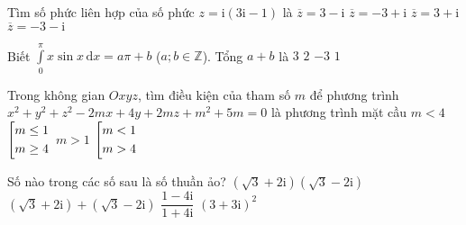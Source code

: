 \begin{ex}%
	Tìm số phức liên hợp của số phức $z = \mathrm{i}\left(3\mathrm{i} - 1\right)$ là
	\choice
	{$\overline{z} = 3 - \mathrm{i}$}
	{\True $\overline{z} = - 3 + \mathrm{i}$}
	{$\overline{z} = 3 + \mathrm{i}$}
	{$\overline{z} = - 3 - \mathrm{i}$}
\end{ex}


\begin{ex}%
	Biết  $\displaystyle\int\limits_{0}^{\pi}x\sin x\, \mathrm{d}x = a\pi + b$ ($a; b \in \mathbb{Z}$). Tổng $a + b$ là
	\choice
	{$3$}
	{$2$}
	{$- 3$}
	{\True $1$}
\end{ex}

\begin{ex}%
Trong không gian $Oxyz$, tìm điều kiện của tham số $m$ để phương trình $x^2 + y^2 + z^2  - 2mx + 4y + 2mz + m^2 + 5m = 0$ là phương trình mặt cầu
	\choice
	{$m < 4$}
	{$\left[\begin{aligned}&m\leq 1\\&m\geq 4\end{aligned}\right.$}
	{$m > 1$}
	{\True $\left[\begin{aligned}&m < 1\\& m> 4\end{aligned}\right.$}
\end{ex}

\begin{ex}%
Số nào trong các số sau là số thuần ảo?
	\choice
	{$\left(\sqrt{3} + 2\mathrm{i}\right)\left(\sqrt{3} - 2\mathrm{i}\right)$}
	{$\left(\sqrt{3} + 2\mathrm{i}\right) + \left(\sqrt{3} - 2\mathrm{i}\right)$}
	{$\dfrac{1 - 4\mathrm{i}}{1 + 4\mathrm{i}}$}
	{\True $\left(3+ 3\mathrm{i}\right)^2$}
\end{ex}

